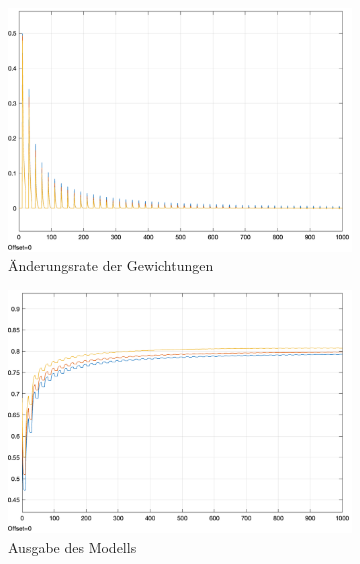 \begin{figure}[h]
  \centering
  \begin{subfigure}[b]{0.3\textwidth}
    \includegraphics[width=\textwidth]{abbildungen/c_ep_approx_convergence_weight_update.png}
    \caption{Änderungsrate der Gewichtungen}
  \end{subfigure}%
  \hfill
  \begin{subfigure}[b]{0.3\textwidth}
    \includegraphics[width=\textwidth]{abbildungen/c_ep_approx_convergence_ausgabe.png}
    \caption{Ausgabe des Modells}
  \end{subfigure}%
  \hfill
  \begin{subfigure}[b]{0.3\textwidth}

\end{subfigure}
\end{figure}
